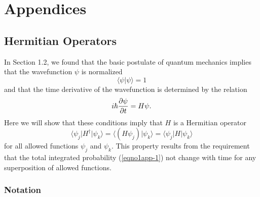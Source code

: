 \section{Appendices}
\subsection{Hermitian Operators}
\label{app-a}
    
In Section 1.2, we found that the basic postulate of quantum mechanics
implies that the wavefunction $\psi$ is normalized
\begin{equation}
\langle \psi \vert \psi \rangle = 1
\label{eqno1app-1}
\end{equation}
and that the time derivative of the wavefunction is determined by the relation
\begin{equation}
i \hbar {\partial \psi \over \partial t} = H \psi .
\label{eqno1app-2}
\end{equation}
Here we will show that these conditions imply that $H$ is a Hermitian operator
\begin{equation}
\langle \psi_j \vert H^{\dag} \vert \psi_k \rangle 
 = \langle \left( H \psi_j \right) \vert \psi_k \rangle 
 = \langle \psi_j \vert H \vert \psi_k \rangle
\end{equation}
for all allowed functions $\psi_j$ and $\psi_k$.  This property
results from the requirement that the total integrated probability
(\ref{eqno1app-1}) not change with time for any superposition of
allowed functions.

\subsubsection{Notation}

